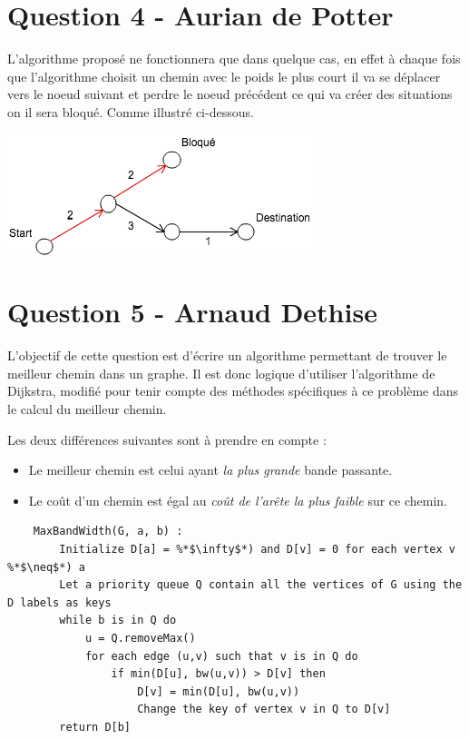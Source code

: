 \documentclass[10pt,a4paper]{article}
\begin{document}
\section*{Question 4 - Aurian de Potter}
L'algorithme proposé ne fonctionnera que dans quelque cas, en effet à chaque fois que l'algorithme choisit un chemin avec le poids le plus court il va se déplacer vers le noeud suivant et perdre le noeud précédent ce qui va créer des situations on il sera bloqué. Comme illustré ci-dessous.

\begin{center}
    \includegraphics[scale=0.7]{ex.png}
\end{center}

\section*{Question 5 - Arnaud Dethise}

	L'objectif de cette question est d'écrire un algorithme permettant de trouver le meilleur chemin dans un graphe. 
	Il est donc logique d'utiliser l'algorithme de Dijkstra, modifié pour tenir compte des méthodes spécifiques à ce problème dans le calcul du meilleur chemin.
	
	Les deux différences suivantes sont à prendre en compte :
	\begin{itemize}
	\item Le meilleur chemin est celui ayant \textit{la plus grande} bande passante.
	\item Le coût d'un chemin est égal au \textit{coût de l'arête la plus faible} sur ce chemin.
	\end{itemize}
	
	\begin{lstlisting}
	MaxBandWidth(G, a, b) :
		Initialize D[a] = %*$\infty$*) and D[v] = 0 for each vertex v %*$\neq$*) a
		Let a priority queue Q contain all the vertices of G using the D labels as keys
		while b is in Q do
			u = Q.removeMax()
			for each edge (u,v) such that v is in Q do
				if min(D[u], bw(u,v)) > D[v] then
					D[v] = min(D[u], bw(u,v))
					Change the key of vertex v in Q to D[v]
		return D[b]
	\end{lstlisting}
\end{document}
